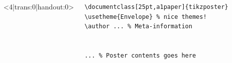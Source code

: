 \begin{frame}[fragile]
\begin{columns}
\begin{column}{.48\textwidth}
\end{column}
\end{columns}


\begin{columns}<4|trans:0|handout:0>
\begin{column}{.5\textwidth}
\begin{beamerboxesrounded}[width=\linewidth]{}
\begin{lstlisting}[basicstyle=\ttfamily\small,
moretexcs={usetheme,frametitle,frame},
emph={beamer,beamerposter,frame},
escapechar={:},lineskip=-2pt]
\documentclass[25pt,a1paper]{tikzposter}
\usetheme{Envelope} % nice themes!
\author ... % Meta-information


... % Poster contents goes here


\end{lstlisting}
\end{beamerboxesrounded}
\end{column}
\end{columns}
\end{frame}
